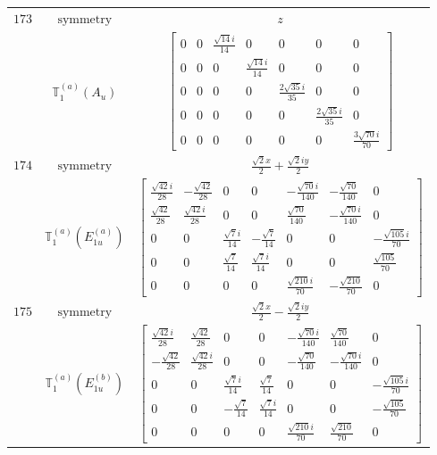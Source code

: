 \documentclass[fleqn,8pt,landscape]{jsarticle}
\begin{document}
\begin{longtable}{ccc}
$ 173 $ & $ \text{symmetry} $ & $ z $ \\
$  $ & $ \mathbb{T}_{1}^{(a)}(A_{u}) $ & $ \begin{bmatrix} 0 & 0 & \frac{\sqrt{14} i}{14} & 0 & 0 & 0 & 0 \\ 0 & 0 & 0 & \frac{\sqrt{14} i}{14} & 0 & 0 & 0 \\ 0 & 0 & 0 & 0 & \frac{2 \sqrt{35} i}{35} & 0 & 0 \\ 0 & 0 & 0 & 0 & 0 & \frac{2 \sqrt{35} i}{35} & 0 \\ 0 & 0 & 0 & 0 & 0 & 0 & \frac{3 \sqrt{70} i}{70} \end{bmatrix} $ \\ \hline
$ 174 $ & $ \text{symmetry} $ & $ \frac{\sqrt{2} x}{2} + \frac{\sqrt{2} i y}{2} $ \\
$  $ & $ \mathbb{T}_{1}^{(a)}(E_{1u}^{(a)}) $ & $ \begin{bmatrix} \frac{\sqrt{42} i}{28} & - \frac{\sqrt{42}}{28} & 0 & 0 & - \frac{\sqrt{70} i}{140} & - \frac{\sqrt{70}}{140} & 0 \\ \frac{\sqrt{42}}{28} & \frac{\sqrt{42} i}{28} & 0 & 0 & \frac{\sqrt{70}}{140} & - \frac{\sqrt{70} i}{140} & 0 \\ 0 & 0 & \frac{\sqrt{7} i}{14} & - \frac{\sqrt{7}}{14} & 0 & 0 & - \frac{\sqrt{105} i}{70} \\ 0 & 0 & \frac{\sqrt{7}}{14} & \frac{\sqrt{7} i}{14} & 0 & 0 & \frac{\sqrt{105}}{70} \\ 0 & 0 & 0 & 0 & \frac{\sqrt{210} i}{70} & - \frac{\sqrt{210}}{70} & 0 \end{bmatrix} $ \\ \hline
$ 175 $ & $ \text{symmetry} $ & $ \frac{\sqrt{2} x}{2} - \frac{\sqrt{2} i y}{2} $ \\
$  $ & $ \mathbb{T}_{1}^{(a)}(E_{1u}^{(b)}) $ & $ \begin{bmatrix} \frac{\sqrt{42} i}{28} & \frac{\sqrt{42}}{28} & 0 & 0 & - \frac{\sqrt{70} i}{140} & \frac{\sqrt{70}}{140} & 0 \\ - \frac{\sqrt{42}}{28} & \frac{\sqrt{42} i}{28} & 0 & 0 & - \frac{\sqrt{70}}{140} & - \frac{\sqrt{70} i}{140} & 0 \\ 0 & 0 & \frac{\sqrt{7} i}{14} & \frac{\sqrt{7}}{14} & 0 & 0 & - \frac{\sqrt{105} i}{70} \\ 0 & 0 & - \frac{\sqrt{7}}{14} & \frac{\sqrt{7} i}{14} & 0 & 0 & - \frac{\sqrt{105}}{70} \\ 0 & 0 & 0 & 0 & \frac{\sqrt{210} i}{70} & \frac{\sqrt{210}}{70} & 0 \end{bmatrix} $ \\ \hline

\end{longtable}
\end{document}
